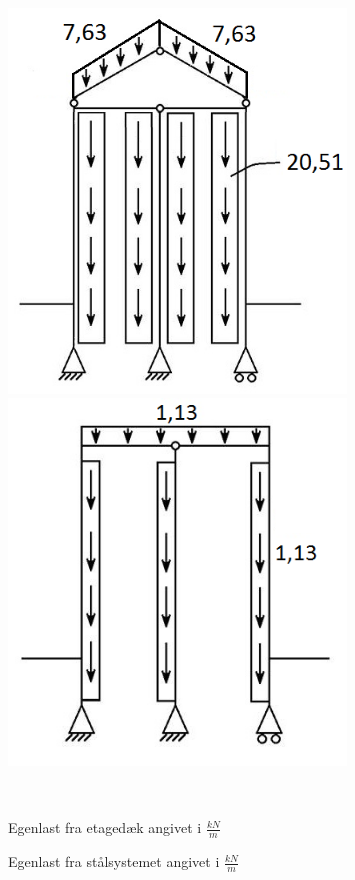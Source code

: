 \begin{figure}[htbp]\centering
	\begin{minipage}[b]{0.48\textwidth}\centering
		\includegraphics[width=0.80\textwidth]{billeder/egenlastetage.png} %
	\end{minipage}\hfill
	\begin{minipage}[b]{0.48\textwidth}\centering
		\includegraphics[width=0.8\textwidth]{billeder/egenlaststaal.png} %
	\end{minipage}\\ %
	\begin{minipage}[t]{0.48\textwidth}
		\caption{Egenlast fra etagedæk angivet i $\frac{kN}{m}$} %
		\label{fig:m}
	\end{minipage}\hfill
	\begin{minipage}[t]{0.48\textwidth}
		\caption{Egenlast fra stålsystemet angivet i $\frac{kN}{m}$} %
		\label{fig:n}
	\end{minipage}
\end{figure}

